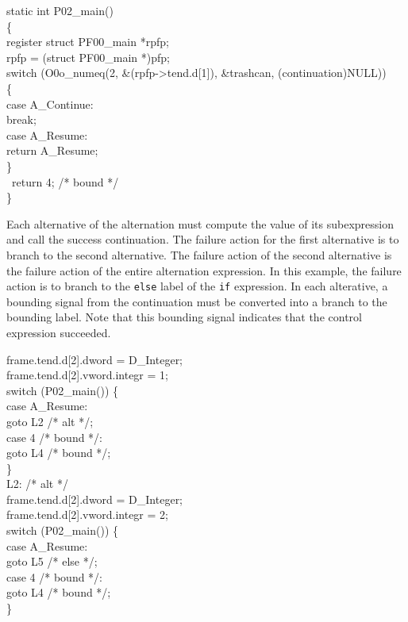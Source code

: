 \goodbreak
\begin{iconcode}
static int P02\_main()\\
\{\\
register struct PF00\_main *rpfp;\\

rpfp = (struct PF00\_main *)pfp;\\
switch (O0o\_numeq(2, \&(rpfp->tend.d[1]), \&trashcan, (continuation)NULL))\\
\>\{\\
\>case A\_Continue:\\
\>\>break;\\
\>case A\_Resume:\\
\>\>return A\_Resume;\\
\>\}\\
\ return 4; /* bound */\\
\}\\
\end{iconcode}

\noindent
Each alternative of the alternation must compute the value of its
subexpression and call the success continuation. The failure action
for the first alternative is to branch to the second alternative. The
failure action of the second alternative is the failure action of the
entire alternation expression. In this example, the failure action is
to branch to the \texttt{else} label of the \texttt{if} expression. In
each alterative, a bounding signal from the continuation must be
converted into a branch to the bounding label. Note that this bounding
signal indicates that the control expression succeeded.

\goodbreak
\begin{iconcode}
frame.tend.d[2].dword = D\_Integer;\\
frame.tend.d[2].vword.integr = 1;\\
switch (P02\_main()) \{\\
\>case A\_Resume:\\
\>\>goto L2 /* alt */;\\
\>case 4 /* bound */:\\
\>\>goto L4 /* bound */;\\
\>\}\\
L2: /* alt */\\
\>frame.tend.d[2].dword = D\_Integer;\\
\>frame.tend.d[2].vword.integr = 2;\\
\>switch (P02\_main()) \{\\
\>\>case A\_Resume:\\
\>\>\>goto L5 /* else */;\\
\>\>case 4 /* bound */:\\
\>\>\>goto L4 /* bound */;\\
\>\>\}\\
\end{iconcode}



